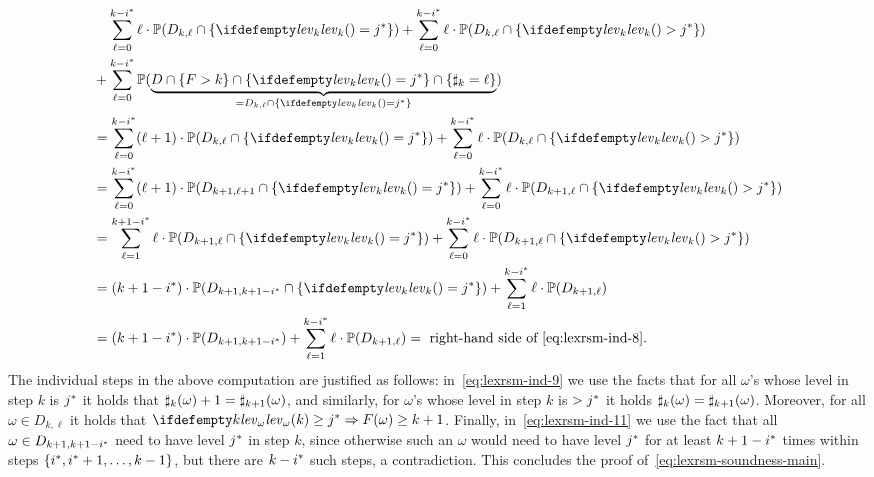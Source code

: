 \begin{align}
&\phantom{+}\;\sum_{\ell=0}^{k-\fixn{i}} \ell\cdot\probm(D_{k,\ell} \cap \{\levelrank{}{k}=\fixn{j}\}) + \sum_{\ell=0}^{k-\fixn{i}} \ell\cdot\probm(D_{k,\ell}\cap \{\levelrank{}{k}>\fixn{j}\} )\nonumber \\ 
&+\sum_{\ell=0}^{k-\fixn{i}}\probm(\underbrace{D \cap \{F>k\} \cap \{\levelrank{}{k} = \fixn{j}\} \cap \{\noofdec_k = \ell\}}_{=D_{k,\ell} \cap \{\levelrank{}{k} = \fixn{j}\}})
\nonumber \\
&= \sum_{\ell=0}^{k-\fixn{i}}(\ell+1) \cdot\probm(D_{k,\ell}\cap \{\levelrank{}{k} = \fixn{j}\}) +  \sum_{\ell=0}^{k-\fixn{i}} \ell\cdot\probm(D_{k,\ell}\cap \{\levelrank{}{k}>\fixn{j}\} ) \nonumber\\
&=\sum_{\ell=0}^{k-\fixn{i}} (\ell+1)\cdot \probm{(D_{k+1,\ell+1} \cap \{\levelrank{}{k} = \fixn{j}\})} +  \sum_{\ell=0}^{k-\fixn{i}} \ell\cdot\probm(D_{k+1,\ell}\cap \{\levelrank{}{k}>\fixn{j}\} ) \label{eq:lexrsm-ind-9}\\
&= \sum_{\ell=1}^{k+1-\fixn{i}} \ell\cdot \probm{(D_{k+1,\ell} \cap \{\levelrank{}{k} = \fixn{j}\})} +  \sum_{\ell=0}^{k-\fixn{i}} \ell\cdot\probm(D_{k+1,\ell}\cap \{\levelrank{}{k}>\fixn{j}\} )
\nonumber \\
&= (k+1-\fixn{i})\cdot \probm{(D_{k+1,k+1-\fixn{i}}\cap\{\levelrank{}{k} =\fixn{j} \} )} + \sum_{\ell=1}^{k-\fixn{i}} \ell \cdot \probm(D_{k+1,\ell})  \nonumber\\
&= (k+1-\fixn{i})\cdot\probm(D_{k+1,k+1-\fixn{i}}) + \sum_{\ell=1}^{k-\fixn{i}}\ell\cdot\probm(D_{k+1,\ell}) = \text{ right-hand side of~\eqref{eq:lexrsm-ind-8}} \label{eq:lexrsm-ind-11}.
\end{align}
The individual steps in the above computation are justified as follows: 
in~\eqref{eq:lexrsm-ind-9} we use the facts that for all $\omega$'s whose level 
in step $k$ is ${j}^*$ it holds that 
$\sharp_k(\omega)+1=\sharp_{k+1}(\omega)$, and similarly, for $\omega$'s 
whose level in step $k$ is $>{j}^*$ it holds 
$\sharp_k(\omega)=\sharp_{k+1}(\omega)$. Moreover, for all $\omega\in 
D_{k,\ell}$ it holds that $\levelrank{k}{\omega}\geq \fixn{j} \Rightarrow 
F(\omega)\geq k+1$. Finally, in~\eqref{eq:lexrsm-ind-11} we use the fact that 
all $\omega\in D_{k+1,k+1-{i}^*}$ need to have level ${j}^*$ in step $k$, 
since otherwise such an $\omega$ would need to have level ${j}^*$ for at 
least $k+1-{i}^*$ times within steps $\{{i}^*,{i}^*+1,\dots,k-1\}$, 
but there are $k-{i}^*$ such steps, a contradiction. This concludes the 
proof of~\eqref{eq:lexrsm-soundness-main}.

